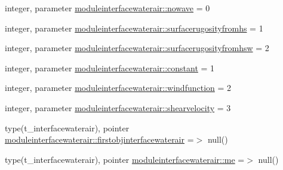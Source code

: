 \begin{DoxyCompactItemize}
\item 
integer, parameter \mbox{\hyperlink{namespacemoduleinterfacewaterair_a9e6fc9893e6a61442860c5361e65ef24}{moduleinterfacewaterair\+::nowave}} = 0
\item 
integer, parameter \mbox{\hyperlink{namespacemoduleinterfacewaterair_a48f8ac61c3aadc9ee602467e19d9939a}{moduleinterfacewaterair\+::surfacerugosityfromhs}} = 1
\item 
integer, parameter \mbox{\hyperlink{namespacemoduleinterfacewaterair_a1a742a8ff8b7f163b4dc4673bdf8482f}{moduleinterfacewaterair\+::surfacerugosityfromhsw}} = 2
\item 
integer, parameter \mbox{\hyperlink{namespacemoduleinterfacewaterair_af9a5813643af305d2fcb128710906ce2}{moduleinterfacewaterair\+::constant}} = 1
\item 
integer, parameter \mbox{\hyperlink{namespacemoduleinterfacewaterair_ab0bf8dbd48fafcd7c122816cd5ebce18}{moduleinterfacewaterair\+::windfunction}} = 2
\item 
integer, parameter \mbox{\hyperlink{namespacemoduleinterfacewaterair_afc5639ec5cd09597dc78cfe2ee596fd0}{moduleinterfacewaterair\+::shearvelocity}} = 3
\item 
type(t\+\_\+interfacewaterair), pointer \mbox{\hyperlink{namespacemoduleinterfacewaterair_a55db38560ef3abcb02cfd5a7c17dc800}{moduleinterfacewaterair\+::firstobjinterfacewaterair}} =$>$ null()
\item 
type(t\+\_\+interfacewaterair), pointer \mbox{\hyperlink{namespacemoduleinterfacewaterair_afff814b0fb4c5feeb5a9e6278d4f6fb5}{moduleinterfacewaterair\+::me}} =$>$ null()
\end{DoxyCompactItemize}
